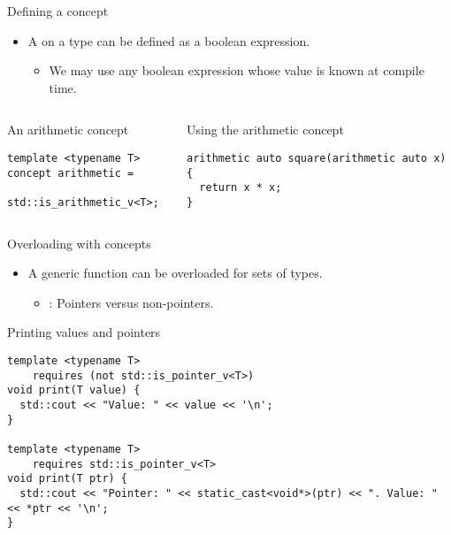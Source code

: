 \begin{frame}[t,fragile]{Defining a concept}
\begin{itemize}
  \item A  on a type can be defined as a boolean expression.
    \begin{itemize}
      \item We may use any boolean expression whose value is known at compile time.
    \end{itemize}
\end{itemize}

\begin{columns}[T]

\begin{block}{An arithmetic concept}
\begin{lstlisting}
template <typename T>
concept arithmetic = 
  std::is_arithmetic_v<T>;
\end{lstlisting}
\end{block}

\begin{block}{Using the arithmetic concept}
\begin{lstlisting}
arithmetic auto square(arithmetic auto x) {
  return x * x;
}
\end{lstlisting}
\end{block}

\end{columns}
\end{frame}

\begin{frame}[t,fragile]{Overloading with concepts}
\begin{itemize}
  \item A generic function can be overloaded for sets of types.
    \begin{itemize}
      \item {}: Pointers versus non-pointers.
    \end{itemize}
\end{itemize}

\begin{block}{Printing values and pointers}
\begin{lstlisting}
template <typename T>
    requires (not std::is_pointer_v<T>)
void print(T value) {
  std::cout << "Value: " << value << '\n';
}

template <typename T>
    requires std::is_pointer_v<T>
void print(T ptr) {
  std::cout << "Pointer: " << static_cast<void*>(ptr) << ". Value: " << *ptr << '\n';
}
\end{lstlisting}
\end{block}

\end{frame}

